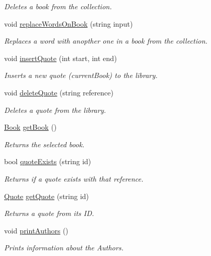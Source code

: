 \begin{DoxyCompactItemize}
\begin{DoxyCompactList}\small\item\em Deletes a book from the collection. \end{DoxyCompactList}\item 
void \hyperlink{class_library_a6d34fd014c959f8c13d9db2edf5bb99a}{replace\+Words\+On\+Book} (string input)
\begin{DoxyCompactList}\small\item\em Replaces a word with anopther one in a book from the collection. \end{DoxyCompactList}\item 
void \hyperlink{class_library_aac2d7d4645a2adda29a0064bc66e6143}{insert\+Quote} (int start, int end)
\begin{DoxyCompactList}\small\item\em Inserts a new quote (current\+Book) to the library. \end{DoxyCompactList}\item 
void \hyperlink{class_library_a8f11e390553184c2a3a549697df3f3a9}{delete\+Quote} (string reference)
\begin{DoxyCompactList}\small\item\em Deletes a quote from the library. \end{DoxyCompactList}\item 
\hyperlink{class_book}{Book} \hyperlink{class_library_a67ccad51c76c3abfb0d46fa533f46e03}{get\+Book} ()
\begin{DoxyCompactList}\small\item\em Returns the selected book. \end{DoxyCompactList}\item 
bool \hyperlink{class_library_a4d87e1bd531b56f79d1faa8781f34630}{quote\+Exists} (string id)
\begin{DoxyCompactList}\small\item\em Returns if a quote exists with that reference. \end{DoxyCompactList}\item 
\hyperlink{class_quote}{Quote} \hyperlink{class_library_aba57d7dcf92c9da4c3d8a359ceba7e2b}{get\+Quote} (string id)
\begin{DoxyCompactList}\small\item\em Returns a quote from its ID. \end{DoxyCompactList}\item 
void \hyperlink{class_library_aba2ed0b3b1ee81565ca5b62f2ac5c924}{print\+Authors} ()
\begin{DoxyCompactList}\small\item\em Prints information about the Authors. \end{DoxyCompactList}\item 

\end{DoxyCompactItemize}
